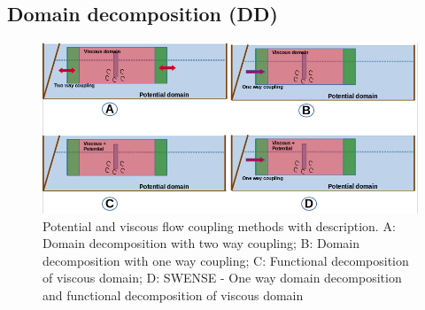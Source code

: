 \documentclass[preprint,12pt]{article}
\begin{document}
{\subsection{Domain decomposition (DD)}
\begin{figure}
\includegraphics[width=\textwidth]{SWENSE.jpg}
\caption{Potential and viscous flow coupling methods with description. A: Domain decomposition with two way coupling; B: Domain decomposition with one way coupling; C: Functional decomposition of viscous domain; D: SWENSE - One way domain decomposition and functional decomposition of viscous domain}
\label{coupling}
\end{figure}

}
\end{document}
